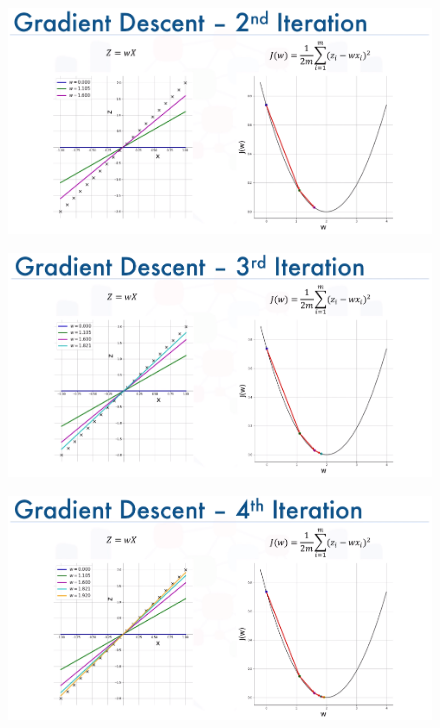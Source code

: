 \documentclass[10pt, compress]{beamer}
\begin{document}
\begin{frame}
  \begin{figure}
    \includegraphics[width=1\linewidth]{imgs/edx_dl_keras/gd8}
  \end{figure}
\end{frame}

\begin{frame}
  \begin{figure}
    \includegraphics[width=1\linewidth]{imgs/edx_dl_keras/gd9}
  \end{figure}
\end{frame}

\begin{frame}
  \begin{figure}
    \includegraphics[width=1\linewidth]{imgs/edx_dl_keras/gd10}
  \end{figure}
\end{frame}
\end{document}
